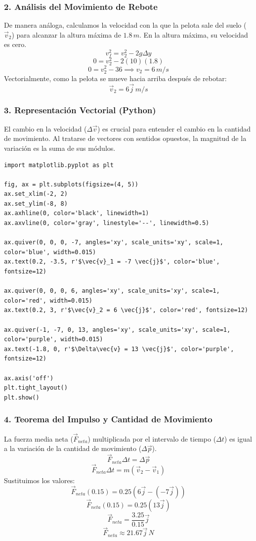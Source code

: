 \documentclass[12pt, a4paper]{article}
\begin{document}
\subsubsection*{2. Análisis del Movimiento de Rebote}
De manera análoga, calculamos la velocidad con la que la pelota sale del suelo ($\vec{v}_2$) para alcanzar la altura máxima de $1.8 \, \si{m}$. En la altura máxima, su velocidad es cero.
\[ v_f^2 = v_2^2 - 2g \Delta y \]
\[ 0 = v_2^2 - 2(10)(1.8) \]
\[ 0 = v_2^2 - 36 \implies v_2 = 6 \, \si{m/s} \]
Vectorialmente, como la pelota se mueve hacia arriba después de rebotar:
\[ \vec{v}_2 = 6 \vec{j} \, \si{m/s} \]

\subsubsection*{3. Representación Vectorial (Python)}
El cambio en la velocidad ($\Delta\vec{v}$) es crucial para entender el cambio en la cantidad de movimiento. Al tratarse de vectores con sentidos opuestos, la magnitud de la variación es la suma de sus módulos.

\begin{lstlisting}
import matplotlib.pyplot as plt

fig, ax = plt.subplots(figsize=(4, 5))
ax.set_xlim(-2, 2)
ax.set_ylim(-8, 8)
ax.axhline(0, color='black', linewidth=1)
ax.axvline(0, color='gray', linestyle='--', linewidth=0.5)

ax.quiver(0, 0, 0, -7, angles='xy', scale_units='xy', scale=1, color='blue', width=0.015)
ax.text(0.2, -3.5, r'$\vec{v}_1 = -7 \vec{j}$', color='blue', fontsize=12)

ax.quiver(0, 0, 0, 6, angles='xy', scale_units='xy', scale=1, color='red', width=0.015)
ax.text(0.2, 3, r'$\vec{v}_2 = 6 \vec{j}$', color='red', fontsize=12)

ax.quiver(-1, -7, 0, 13, angles='xy', scale_units='xy', scale=1, color='purple', width=0.015)
ax.text(-1.8, 0, r'$\Delta\vec{v} = 13 \vec{j}$', color='purple', fontsize=12)

ax.axis('off')
plt.tight_layout()
plt.show()
\end{lstlisting}

\subsubsection*{4. Teorema del Impulso y Cantidad de Movimiento}
La fuerza media neta ($\vec{F}_{neta}$) multiplicada por el intervalo de tiempo ($\Delta t$) es igual a la variación de la cantidad de movimiento ($\Delta\vec{p}$).
\[ \vec{F}_{neta} \Delta t = \Delta\vec{p} \]
\[ \vec{F}_{neta} \Delta t = m(\vec{v}_2 - \vec{v}_1) \]
Sustituimos los valores:
\[ \vec{F}_{neta} (0.15) = 0.25 (6 \vec{j} - (-7 \vec{j})) \]
\[ \vec{F}_{neta} (0.15) = 0.25 (13 \vec{j}) \]
\[ \vec{F}_{neta} = \frac{3.25}{0.15} \vec{j} \]
\[ \vec{F}_{neta} \approx 21.67 \vec{j} \, \si{N} \]
\end{document}

